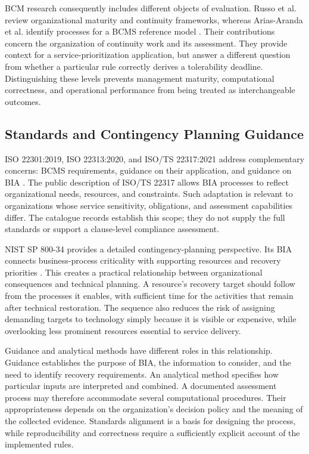 BCM research consequently includes different objects of evaluation. Russo et al. review organizational maturity and continuity frameworks, whereas Arias-Aranda et al. identify processes for a BCMS reference model \cite{russo2023maturity,bcms2026reference}. Their contributions concern the organization of continuity work and its assessment. They provide context for a service-prioritization application, but answer a different question from whether a particular rule correctly derives a tolerability deadline. Distinguishing these levels prevents management maturity, computational correctness, and operational performance from being treated as interchangeable outcomes.

\subsection{Standards and Contingency Planning Guidance}
\label{sec:lr_standards}

ISO 22301:2019, ISO 22313:2020, and ISO/TS 22317:2021 address complementary concerns: BCMS requirements, guidance on their application, and guidance on BIA \cite{iso22301catalogue,iso22313catalogue,iso22317catalogue}. The public description of ISO/TS 22317 allows BIA processes to reflect organizational needs, resources, and constraints. Such adaptation is relevant to organizations whose service sensitivity, obligations, and assessment capabilities differ. The catalogue records establish this scope; they do not supply the full standards or support a clause-level compliance assessment.



NIST SP 800-34 provides a detailed contingency-planning perspective. Its BIA connects business-process criticality with supporting resources and recovery priorities \cite{nist2010contingency}. This creates a practical relationship between organizational consequences and technical planning. A resource's recovery target should follow from the processes it enables, with sufficient time for the activities that remain after technical restoration. The sequence also reduces the risk of assigning demanding targets to technology simply because it is visible or expensive, while overlooking less prominent resources essential to service delivery.

Guidance and analytical methods have different roles in this relationship. Guidance establishes the purpose of BIA, the information to consider, and the need to identify recovery requirements. An analytical method specifies how particular inputs are interpreted and combined. A documented assessment process may therefore accommodate several computational procedures. Their appropriateness depends on the organization's decision policy and the meaning of the collected evidence. Standards alignment is a basis for designing the process, while reproducibility and correctness require a sufficiently explicit account of the implemented rules.

